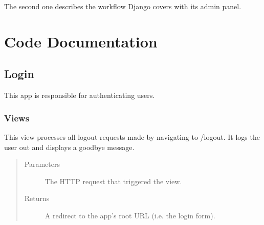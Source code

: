 \documentclass[letterpaper,10pt,english]{sphinxmanual}
\begin{document}

The second one describes the workflow Django covers with its admin panel.



\chapter{Code Documentation}
\label{\detokenize{masterCodeDoc:code-documentation}}\label{\detokenize{masterCodeDoc::doc}}

\section{Login}
\label{\detokenize{masterCodeDoc:login}}
This app is responsible for authenticating users.


\subsection{Views}
\label{\detokenize{masterCodeDoc:module-login.views}}\label{\detokenize{masterCodeDoc:views}}

\begin{fulllineitems}
\label{\detokenize{masterCodeDoc:login.views.logout_request}}
This view processes all logout requests made by navigating to /logout. It logs the user out and displays a goodbye message.
\begin{quote}\begin{description}
\item[{Parameters}] \leavevmode
{} \textendash{} The HTTP request that triggered the view.

\item[{Returns}] \leavevmode
A redirect to the app’s root URL (i.e. the login form).

\end{description}\end{quote}

\end{fulllineitems}
\end{document}
